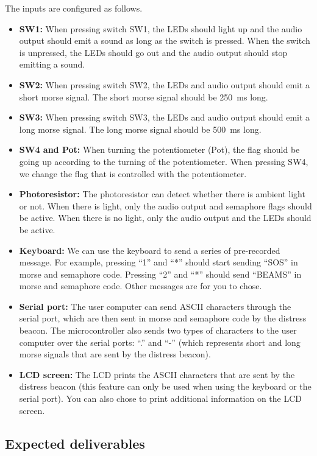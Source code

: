 The inputs are configured as follows. 
\begin{itemize}
	\item \textbf{SW1:} When pressing switch SW1, the LEDs should light up and the audio output should emit a sound as long as the switch is pressed. When the switch is unpressed, the LEDs should go out and the audio output should stop emitting a sound. 
	\item \textbf{SW2:} When pressing switch SW2, the LEDs and audio output should emit a short morse signal. The short morse signal should be 250~ms long. 
	\item \textbf{SW3: } When pressing switch SW3, the LEDs and audio output should emit a long morse signal. The long morse signal should be 500~ms long. 
	\item \textbf{SW4 and Pot: } When turning the potentiometer (Pot), the flag should be going up according to the turning of the potentiometer. When pressing SW4, we change the flag that is controlled with the potentiometer. 
	\item \textbf{Photoresistor: } The photoresistor can detect whether there is ambient light or not. When there is light, only the audio output and semaphore flags should be active. When there is no light, only the audio output and the LEDs should be active. 
	\item \textbf{Keyboard: } We can use the keyboard to send a series of pre-recorded message. For example, pressing ``1'' and ``*'' should start sending ``SOS'' in morse and semaphore code. Pressing ``2'' and ``*'' should send ``BEAMS'' in morse and semaphore code. Other messages are for you to chose. 
	\item \textbf{Serial port: } The user computer can send ASCII characters through the serial port, which are then sent in morse and semaphore code by the distress beacon. The microcontroller also sends two types of characters to the user computer over the serial ports: ``.'' and ``-'' (which represents short and long morse signals that are sent by the distress beacon). 
	\item \textbf{LCD screen: } The LCD prints the ASCII characters that are sent by the distress beacon (this feature can only be used when using the keyboard or the serial port). You can also chose to print additional information on the LCD screen. 
\end{itemize}



\subsection{Expected deliverables}


